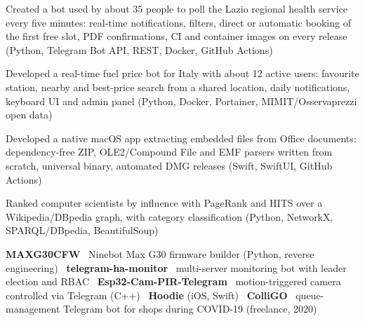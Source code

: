 \documentclass[a4paper,10pt]{article}
\begin{document}
\begin{cvitems}
  \item Created a bot used by about 35 people to poll the Lazio regional health service every five minutes: real-time notifications, filters, direct or automatic booking of the first free slot, PDF confirmations, CI and container images on every release (Python, Telegram Bot API, REST, Docker, GitHub Actions)
\end{cvitems}

\begin{cvitems}
  \item Developed a real-time fuel price bot for Italy with about 12 active users: favourite station, nearby and best-price search from a shared location, daily notifications, keyboard UI and admin panel (Python, Docker, Portainer, MIMIT/Osservaprezzi open data)
\end{cvitems}

\begin{cvitems}
  \item Developed a native macOS app extracting embedded files from Office documents: dependency-free ZIP, OLE2/Compound File and EMF parsers written from scratch, universal binary, automated DMG releases (Swift, SwiftUI, GitHub Actions)
\end{cvitems}

\begin{cvitems}
  \item Ranked computer scientists by influence with PageRank and HITS over a Wikipedia/DBpedia graph, with category classification (Python, NetworkX, SPARQL/DBpedia, BeautifulSoup)
\end{cvitems}

\begin{cvitems}
  \item \textbf{MAXG30CFW} \textendash\ Ninebot Max G30 firmware builder (Python, reverse engineering) \cvsep\ \textbf{telegram-ha-monitor} \textendash\ multi-server monitoring bot with leader election and RBAC \cvsep\ \textbf{Esp32-Cam-PIR-Telegram} \textendash\ motion-triggered camera controlled via Telegram (C++) \cvsep\ \textbf{Hoodie} (iOS, Swift) \cvsep\ \textbf{ColliGO} \textendash\ queue-management Telegram bot for shops during COVID-19 (freelance, 2020)
\end{cvitems}
\end{document}
